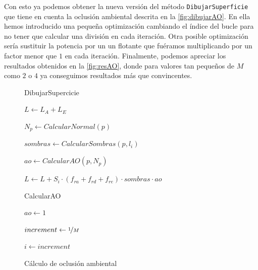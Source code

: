 Con esto ya podemos obtener la nueva versión del método \texttt{DibujarSuperficie} que tiene en cuenta la oclusión ambiental descrita en la \autoref{fig:dibujarAO}. En ella hemos introducido una pequeña optimización \cite{ao_opt} cambiando el índice del bucle para no tener que calcular una división en cada iteración. Otra posible optimización sería sustituir la potencia por un un flotante que fuéramos multiplicando por un factor menor que $1$ en cada iteración. Finalmente, podemos apreciar los resultados obtenidos en la \autoref{fig:resAO}, donde para valores tan pequeños de $M$ como $2$ o $4$ ya conseguimos resultados más que convincentes.


\begin{figure}
    \centering
        
    \begin{algorithm}[H]
        \caption{DibujarSupercicie}
            $L \gets L_A + L_E$ 
             {
    
                
                $N_p \gets CalcularNormal(p)$
                
                $sombras \gets CalcularSombras(p, l_i)$
                
                $ao \gets CalcularAO(p, N_p)$
    
                $L \gets L + S_i\cdot (f_{ra} + f_{rd} + f_{re})\cdot sombras \cdot ao$
            }
    
    \end{algorithm}
    
    \begin{algorithm}[H]
        \caption{CalcularAO}
            $ao \gets 1$
                    
            $increment \gets \nicefrac{1}{M}$
            
            $i\gets increment$
        
                
    \end{algorithm}
    
    \caption{Cálculo de oclusión ambiental}
    \label{fig:dibujarAO}
\end{figure}


